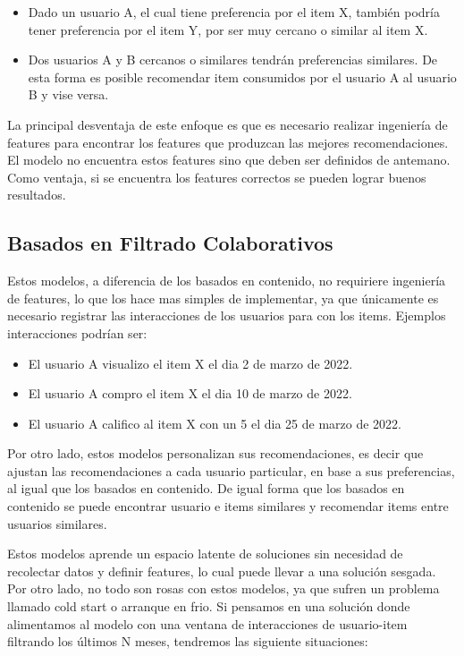 \documentclass[11pt,a4paper,twoside]{thesis}
\begin{document}
\begin{itemize}
\item Dado un usuario A, el cual tiene preferencia por el item X, también podría tener preferencia por el item Y, por ser muy cercano o similar al item X.
\item Dos usuarios A y B cercanos o similares tendrán preferencias similares. De esta forma es posible recomendar item consumidos por el usuario A al usuario B y vise versa. 
\end{itemize}
	
La principal desventaja de este enfoque es que es necesario realizar ingeniería de features para encontrar los features que produzcan las mejores recomendaciones. El modelo no encuentra estos features sino que deben ser definidos de antemano. Como ventaja, si se encuentra los features correctos se pueden lograr buenos resultados.
		
\subsection{Basados en Filtrado Colaborativos} 

Estos modelos, a diferencia de los basados en contenido, no requiriere ingeniería de features, lo que los hace mas simples de implementar, ya que únicamente es necesario registrar las interacciones de los usuarios para con los items. Ejemplos interacciones podrían ser:
			\begin{itemize}
				\item El usuario A visualizo el item X el dia 2 de marzo de 2022.
				\item El usuario A compro el item X el dia 10 de marzo de 2022.
				\item El usuario A califico al item X con un 5 el dia 25 de marzo de 2022.
			\end{itemize}
			Por otro lado, estos modelos personalizan sus recomendaciones, es decir que ajustan las recomendaciones a cada usuario particular, en base a sus preferencias, al igual que los basados en contenido.
			De igual forma que los basados en contenido se puede encontrar usuario e items similares y recomendar items entre usuarios similares.

Estos modelos aprende un espacio latente de soluciones sin necesidad de recolectar datos y definir features, lo cual puede llevar a una solución sesgada. Por otro lado, no todo son rosas con estos modelos, ya que sufren un problema llamado cold start o arranque en frio. Si pensamos en una solución donde alimentamos al modelo con una ventana de interacciones de usuario-item filtrando los últimos N meses, tendremos las siguiente situaciones:
\end{document}
